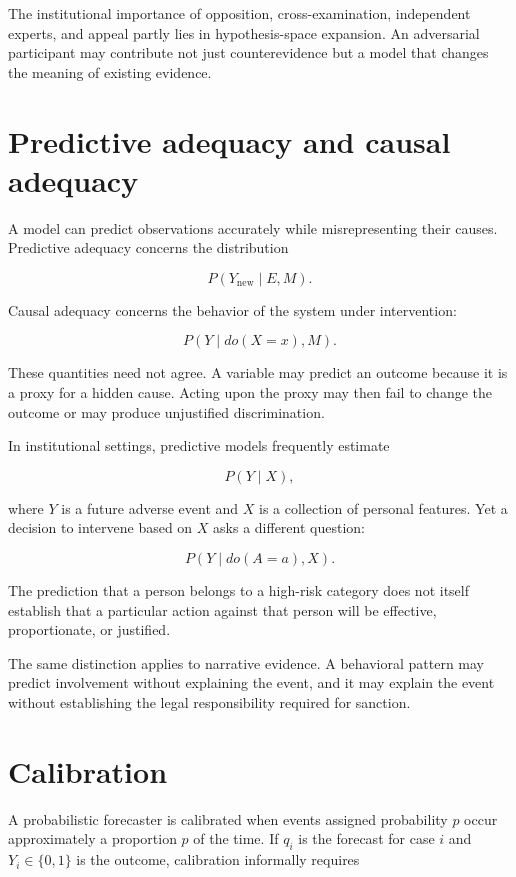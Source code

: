 The institutional importance of opposition, cross-examination, independent experts, and appeal partly lies in hypothesis-space expansion. An adversarial participant may contribute not just counterevidence but a model that changes the meaning of existing evidence.

\section{Predictive adequacy and causal adequacy}
\label{sec:a17}

A model can predict observations accurately while misrepresenting their causes. Predictive adequacy concerns the distribution

\[
P(Y_{\mathrm{new}}\mid E,M).
\]

Causal adequacy concerns the behavior of the system under intervention:

\[
P(Y\mid do(X=x),M).
\]

These quantities need not agree. A variable may predict an outcome because it is a proxy for a hidden cause. Acting upon the proxy may then fail to change the outcome or may produce unjustified discrimination.

In institutional settings, predictive models frequently estimate

\[
P(Y\mid X),
\]

where \(Y\) is a future adverse event and \(X\) is a collection of personal features. Yet a decision to intervene based on \(X\) asks a different question:

\[
P(Y\mid do(A=a),X).
\]

The prediction that a person belongs to a high-risk category does not itself establish that a particular action against that person will be effective, proportionate, or justified.

The same distinction applies to narrative evidence. A behavioral pattern may predict involvement without explaining the event, and it may explain the event without establishing the legal responsibility required for sanction.

\section{Calibration}
\label{sec:a18}

A probabilistic forecaster is calibrated when events assigned probability \(p\) occur approximately a proportion \(p\) of the time. If \(q_i\) is the forecast for case \(i\) and \(Y_i\in\{0,1\}\) is the outcome, calibration informally requires

